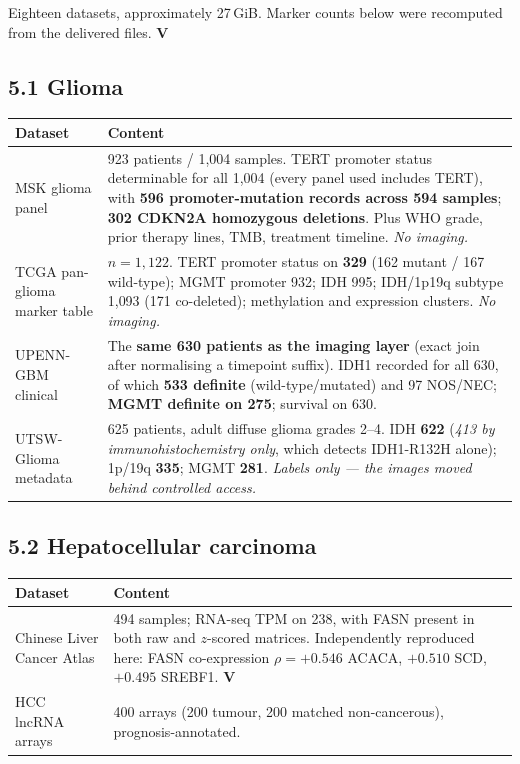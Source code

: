 \documentclass[11pt,a4paper]{article}
\newcommand{\ver}{\textcolor{qgreen}{\textbf{V}}}
\begin{document}
Eighteen datasets, approximately 27\,GiB. Marker counts below were recomputed from the
delivered files. \ver

\subsection*{5.1 Glioma}

\begin{center}
\small
\begin{tabular}{@{}p{4.0cm}p{10.4cm}@{}}
\toprule
\textbf{Dataset} & \textbf{Content} \\
\midrule
MSK glioma panel & 923 patients / 1{,}004 samples. TERT promoter status determinable for
all 1{,}004 (every panel used includes TERT), with \textbf{596 promoter-mutation records
across 594 samples}; \textbf{302 CDKN2A homozygous deletions}. Plus WHO grade, prior
therapy lines, TMB, treatment timeline. \emph{No imaging.} \\
TCGA pan-glioma marker table & $n=1{,}122$. TERT promoter status on \textbf{329}
(162 mutant / 167 wild-type); MGMT promoter 932; IDH 995; IDH/1p19q subtype 1{,}093
(171 co-deleted); methylation and expression clusters. \emph{No imaging.} \\
UPENN-GBM clinical & The \textbf{same 630 patients as the imaging layer} (exact join
after normalising a timepoint suffix). IDH1 recorded for all 630, of which \textbf{533
definite} (wild-type/mutated) and 97 NOS/NEC; \textbf{MGMT definite on 275}; survival on
630. \\
UTSW-Glioma metadata & 625 patients, adult diffuse glioma grades 2--4. IDH \textbf{622}
(\emph{413 by immunohistochemistry only}, which detects IDH1-R132H alone); 1p/19q
\textbf{335}; MGMT \textbf{281}. \emph{Labels only --- the images moved behind controlled
access.} \\
\bottomrule
\end{tabular}
\end{center}

\subsection*{5.2 Hepatocellular carcinoma}

\begin{center}
\small
\begin{tabular}{@{}p{4.0cm}p{10.4cm}@{}}
\toprule
\textbf{Dataset} & \textbf{Content} \\
\midrule
Chinese Liver Cancer Atlas & 494 samples; RNA-seq TPM on 238, with FASN present in both
raw and $z$-scored matrices. Independently reproduced here: FASN co-expression
$\rho=+0.546$ ACACA, $+0.510$ SCD, $+0.495$ SREBF1. \ver \\
HCC lncRNA arrays & 400 arrays (200 tumour, 200 matched non-cancerous),
prognosis-annotated. \\
\bottomrule
\end{tabular}
\end{center}
\end{document}
